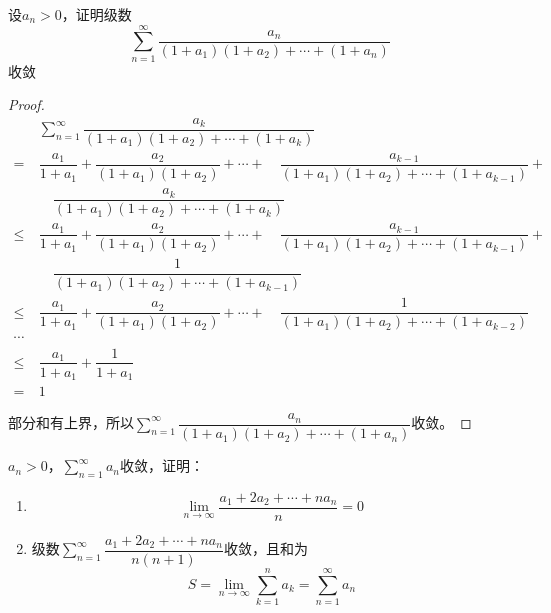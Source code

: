 \begin{proposition}
    
    设$a_n > 0$，证明级数
    $$\sum_{n=1}^{\infty}{\dfrac{a_n}{(1 + a_1)(1 + a_2) + \cdots + (1 + a_n)}}$$
    收敛

\end{proposition}

\begin{proof}
    
    \begin{align*}
        &\sum_{n=1}^{\infty}{\dfrac{a_k}{(1 + a_1)(1 + a_2) + \cdots + (1 + a_k)}} \\
        = \  & \dfrac{a_1}{1 + a_1} + \dfrac{a_2}{(1 + a_1)(1 + a_2)} + \cdots + \quad \dfrac{a_{k-1}}{(1 + a_1)(1 + a_2) + \cdots + (1 + a_{k-1})} + \\
        & \quad \dfrac{a_k}{(1 + a_1)(1 + a_2) + \cdots + (1 + a_k)} \\
        \leq \ & \dfrac{a_1}{1 + a_1} + \dfrac{a_2}{(1 + a_1)(1 + a_2)} + \cdots + \quad \dfrac{a_{k-1}}{(1 + a_1)(1 + a_2) + \cdots + (1 + a_{k-1})} + \\
        & \quad \dfrac{1}{(1 + a_1)(1 + a_2) + \cdots + (1 + a_{k-1})} \\
        \leq \ & \dfrac{a_1}{1 + a_1} + \dfrac{a_2}{(1 + a_1)(1 + a_2)} + \cdots + \quad \dfrac{1}{(1 + a_1)(1 + a_2) + \cdots + (1 + a_{k-2})} \\
        \cdots & \\
        \leq \ & \dfrac{a_1}{1 + a_1} + \dfrac{1}{1 + a_1} \\
        = \ & 1 
    \end{align*}

    部分和有上界，所以$\sum\limits_{n=1}^{\infty}{\dfrac{a_n}{(1 + a_1)(1 + a_2) + \cdots + (1 + a_n)}}$收敛。

\end{proof}

\begin{proposition}
    
    $a_n > 0$，$\sum\limits_{n=1}^{\infty}{a_n}$收敛，证明：

    \begin{enumerate}
        
        \item 
                $$\lim_{n\to\infty}{\dfrac{a_1 + 2a_2 + \cdots + na_n}{n}} = 0$$
        
        \item   
                级数$\sum\limits_{n=1}^{\infty}{\dfrac{a_1 + 2a_2 + \cdots + na_n}{n(n+1)}}$收敛，且和为
                $$S = \lim_{n\to\infty}{\sum\limits_{k=1}^{n}{a_k}} = \sum\limits_{n=1}^{\infty}{a_n}$$

    \end{enumerate}

\end{proposition}

